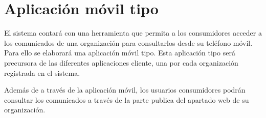 \section{Aplicación móvil tipo}
El sistema contará con una herramienta que permita a los consumidores acceder a los comunicados de una organización para consultarlos desde su teléfono móvil. Para ello se elaborará una aplicación móvil tipo. Esta aplicación tipo será precursora de las diferentes aplicaciones cliente, una por cada organización registrada en el sistema.

Además de a través de la aplicación móvil, los usuarios consumidores podrán consultar los comunicados a través de la parte publica del apartado web de su organización.